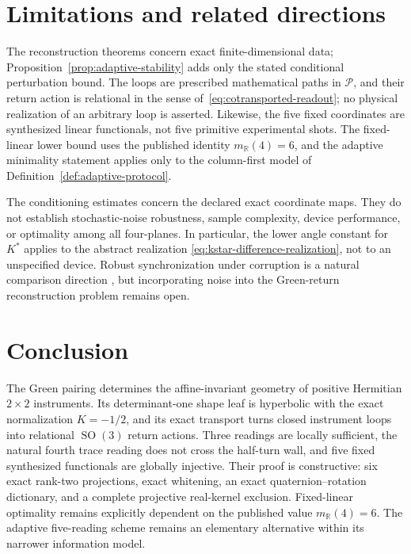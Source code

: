\documentclass[12pt]{article}
\theoremstyle{definition}
\theoremstyle{remark}
\newcommand{\RR}{\mathbb R}
\newcommand{\Pos}{\mathcal P}
\newcommand{\SO}{\operatorname{SO}}
\begin{document}
\section{Limitations and related directions}\label{sec:boundaries}

The reconstruction theorems concern exact finite-dimensional data;
Proposition~\ref{prop:adaptive-stability} adds only the stated conditional
perturbation bound.  The loops are prescribed
mathematical paths in $\Pos$, and their return action is relational in the
sense of~\eqref{eq:cotransported-readout}; no physical realization of an
arbitrary loop is asserted.  Likewise, the five fixed coordinates
are synthesized linear functionals, not five primitive experimental shots.
The fixed-linear lower bound uses the published identity
$m_{\RR}(4)=6$, and the adaptive minimality statement applies only to the
column-first model of Definition~\ref{def:adaptive-protocol}.

The conditioning estimates concern the declared exact coordinate maps.  They
do not establish stochastic-noise robustness, sample complexity, device
performance, or optimality among all four-planes.  In particular, the lower
angle constant for $K^\ast$ applies to the abstract realization
\eqref{eq:kstar-difference-realization}, not to an unspecified device.
Robust synchronization under
corruption is a natural comparison direction
\cite{Singer2011,BandeiraSingerSpielman2013,LangeEtAl2015,ElKarouiWu2016},
but incorporating noise into the Green-return reconstruction problem remains
open.

\section{Conclusion}\label{sec:conclusion}

The Green pairing determines the affine-invariant geometry of positive
Hermitian $2\times2$ instruments.  Its determinant-one shape leaf is
hyperbolic with the exact normalization $K=-1/2$, and its exact transport
turns closed instrument loops into relational $\SO(3)$ return actions.
Three readings are locally sufficient, the natural fourth trace reading does
not cross the half-turn wall, and five fixed synthesized functionals are
globally injective.  Their proof is constructive:
six exact rank-two projections, exact whitening, an exact
quaternion--rotation dictionary, and a complete projective real-kernel
exclusion.  Fixed-linear optimality remains explicitly dependent on the
published value $m_{\RR}(4)=6$.  The adaptive five-reading scheme remains
an elementary alternative within its narrower information model.
\end{document}
